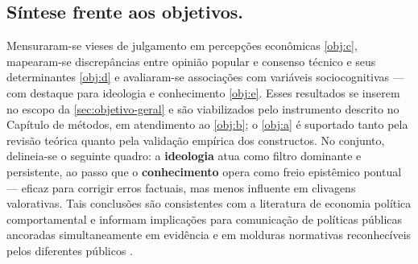 \subsection{Síntese frente aos objetivos.}
Mensuraram-se vieses de julgamento em percepções econômicas \autoref{obj:c}, mapearam-se discrepâncias entre opinião popular e consenso técnico e seus determinantes \autoref{obj:d} e avaliaram-se associações com variáveis sociocognitivas — com destaque para ideologia e conhecimento \autoref{obj:e}. Esses resultados se inserem no escopo da \autoref{sec:objetivo-geral} e são viabilizados pelo instrumento descrito no Capítulo de métodos, em atendimento ao \autoref{obj:b}; o \autoref{obj:a} é suportado tanto pela revisão teórica quanto pela validação empírica dos constructos. No conjunto, delineia-se o seguinte quadro: a \textbf{ideologia} atua como filtro dominante e persistente, ao passo que o \textbf{conhecimento} opera como freio epistêmico pontual — eficaz para corrigir erros factuais, mas menos influente em clivagens valorativas. Tais conclusões são consistentes com a literatura de economia política comportamental e informam implicações para comunicação de políticas públicas ancoradas simultaneamente em evidência e em molduras normativas reconhecíveis pelos diferentes públicos \cite{kahneman2011thinking, kahan2012polarization, Systematically_Biased_Beliefs_about_Economics}.
